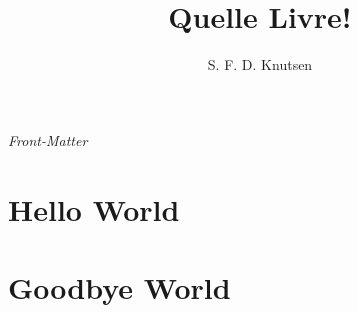 \documentclass[a5paper,twoside,openright]{memoir}
\title{Quelle Livre!}
\author{S. F. D. Knutsen}
\begin{document}
\checkandfixthelayout[nearest]
\thispagestyle{empty}
\begin{center}
	{\LARGE\scshape \thetitle}

	\vspace{4cm}

	{\large\itshape \theauthor}
\end{center}
\cleardoublepage

\setlrmarginsandblock{3cm}{2.5cm}{*} %
\setulmarginsandblock{3.5cm}{3cm}{*}   %
\checkandfixthelayout[nearest]

\frontmatter
{\HUGE\itshape Front-Matter}\vspace{1cm}\\
\lipsum[1-2]

\mainmatter

\chapter{Hello World}
\lipsum[3-10]

\chapter{Goodbye World}
\lipsum[11-20]
\end{document}
